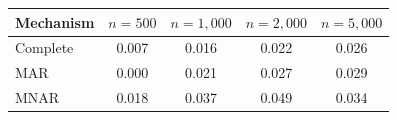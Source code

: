 \begin{tabular}{lcccc}
    \toprule
    Mechanism & $n{=}500$ & $n{=}1{,}000$ & $n{=}2{,}000$ & $n{=}5{,}000$ \\
    \midrule
    Complete  & 0.007 & 0.016 & 0.022 & 0.026 \\
    MAR       & 0.000 & 0.021 & 0.027 & 0.029 \\
    MNAR      & 0.018 & 0.037 & 0.049 & 0.034 \\
    \bottomrule
\end{tabular}
